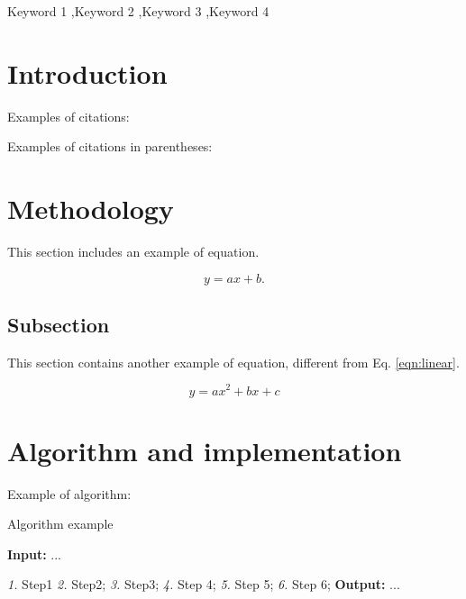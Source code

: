 \documentclass[a4paper,fleqn]{cas-sc}
\begin{document}
\begin{keywords}
Keyword 1 \sep Keyword 2 \sep Keyword 3 \sep Keyword 4
\end{keywords}

\maketitle 

\printcredits

\doublespacing


\section{Introduction}
\label{intro}



Examples of citations:

\cite{gomez1990isim3d, pebesma2004multivariable, hansen2018multiple}

Examples of citations in parentheses: 

\citep{gomez1990isim3d, pebesma2004multivariable, hansen2018multiple}

\section{Methodology}

This section includes an example of equation. 
 
\begin{equation}
\label{eqn:linear}
    y=ax+b.
\end{equation}


\subsection{Subsection}

This section contains another example of equation, different from Eq.  \ref{eqn:linear}.

\begin{equation} 
\label{eqn:quadratic}
    y=ax^2+bx+c
\end{equation}

\section{Algorithm and implementation}

Example of algorithm:
\begin{algorithm}
  \caption{Algorithm example }
  
  \begin{algorithmic}
  \label{alg:Alg1}
  \State \textbf{Input:} ...
   \newline

 \Statex \textit{1.} Step1
  \Statex \textit{2.} Step2;
 \State \textit{3.}  Step3;
  \newline
   \State \textit{4.} Step 4;
   \State \textit{5.}  Step 5;
   \State \textit{6.} Step 6;
   \EndFor
  \EndFor 
  \newline
\State  \textbf{Output: } ... 
  \end{algorithmic} 
\end{algorithm} 
\end{document}
